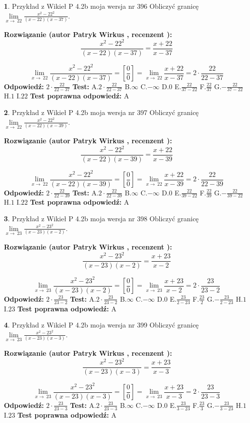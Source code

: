 \documentclass[12pt, a4paper]{article}
\theoremstyle{definition} %
\newtheorem{zad}{}
\newcommand{\zadStart}[1]{\begin{zad}#1\newline}
\newcommand{\zadStop}{\end{zad}}
\newcommand{\rozwStart}[2]{\noindent \textbf{Rozwiązanie (autor #1 , recenzent #2): }\newline}
\newcommand{\rozwStop}{\newline}
\newcommand{\odpStart}{\noindent \textbf{Odpowiedź:}\newline}
\newcommand{\odpStop}{\newline}
\newcommand{\testStart}{\noindent \textbf{Test:}\newline}
\newcommand{\testStop}{\newline}
\newcommand{\kluczStart}{\noindent \textbf{Test poprawna odpowiedź:}\newline}
\newcommand{\kluczStop}{\newline}
\begin{document}
\zadStart{Przykład z Wikieł P 4.2b moja wersja nr 396}
Obliczyć granicę $\lim\limits_{x\to\ 22}\frac{x^{2}-22^{2}}{(x-22)(x-37)}$.
\zadStop
\rozwStart{Patryk Wirkus}{}
$$\frac{x^{2}-22^{2}}{(x-22)(x-37)}=\frac{x+22}{x-37}$$

$$\lim\limits_{x\to\ 22}\frac{x^{2}-22^{2}}{(x-22)(x-37)}=[\frac{0}{0}]=\lim\limits_{x\to\ 22}\frac{x+22}{x-37}=2 \cdot \frac{22}{22-37}$$
\rozwStop
\odpStart
$2 \cdot \frac{22}{22-37}$
\odpStop
\testStart
A.$2 \cdot \frac{22}{22-37}$
B.$\infty$
C.$-\infty$
D.$0$
E.$\frac{22}{37-22}$
F.$\frac{22}{37}$
G.$-\frac{22}{37-22}$
H.$1$
I.$22$
\testStop
\kluczStart
A
\kluczStop



\zadStart{Przykład z Wikieł P 4.2b moja wersja nr 397}
Obliczyć granicę $\lim\limits_{x\to\ 22}\frac{x^{2}-22^{2}}{(x-22)(x-39)}$.
\zadStop
\rozwStart{Patryk Wirkus}{}
$$\frac{x^{2}-22^{2}}{(x-22)(x-39)}=\frac{x+22}{x-39}$$

$$\lim\limits_{x\to\ 22}\frac{x^{2}-22^{2}}{(x-22)(x-39)}=[\frac{0}{0}]=\lim\limits_{x\to\ 22}\frac{x+22}{x-39}=2 \cdot \frac{22}{22-39}$$
\rozwStop
\odpStart
$2 \cdot \frac{22}{22-39}$
\odpStop
\testStart
A.$2 \cdot \frac{22}{22-39}$
B.$\infty$
C.$-\infty$
D.$0$
E.$\frac{22}{39-22}$
F.$\frac{22}{39}$
G.$-\frac{22}{39-22}$
H.$1$
I.$22$
\testStop
\kluczStart
A
\kluczStop



\zadStart{Przykład z Wikieł P 4.2b moja wersja nr 398}
Obliczyć granicę $\lim\limits_{x\to\ 23}\frac{x^{2}-23^{2}}{(x-23)(x-2)}$.
\zadStop
\rozwStart{Patryk Wirkus}{}
$$\frac{x^{2}-23^{2}}{(x-23)(x-2)}=\frac{x+23}{x-2}$$

$$\lim\limits_{x\to\ 23}\frac{x^{2}-23^{2}}{(x-23)(x-2)}=[\frac{0}{0}]=\lim\limits_{x\to\ 23}\frac{x+23}{x-2}=2 \cdot \frac{23}{23-2}$$
\rozwStop
\odpStart
$2 \cdot \frac{23}{23-2}$
\odpStop
\testStart
A.$2 \cdot \frac{23}{23-2}$
B.$\infty$
C.$-\infty$
D.$0$
E.$\frac{23}{2-23}$
F.$\frac{23}{2}$
G.$-\frac{23}{2-23}$
H.$1$
I.$23$
\testStop
\kluczStart
A
\kluczStop



\zadStart{Przykład z Wikieł P 4.2b moja wersja nr 399}
Obliczyć granicę $\lim\limits_{x\to\ 23}\frac{x^{2}-23^{2}}{(x-23)(x-3)}$.
\zadStop
\rozwStart{Patryk Wirkus}{}
$$\frac{x^{2}-23^{2}}{(x-23)(x-3)}=\frac{x+23}{x-3}$$

$$\lim\limits_{x\to\ 23}\frac{x^{2}-23^{2}}{(x-23)(x-3)}=[\frac{0}{0}]=\lim\limits_{x\to\ 23}\frac{x+23}{x-3}=2 \cdot \frac{23}{23-3}$$
\rozwStop
\odpStart
$2 \cdot \frac{23}{23-3}$
\odpStop
\testStart
A.$2 \cdot \frac{23}{23-3}$
B.$\infty$
C.$-\infty$
D.$0$
E.$\frac{23}{3-23}$
F.$\frac{23}{3}$
G.$-\frac{23}{3-23}$
H.$1$
I.$23$
\testStop
\kluczStart
A
\kluczStop
\end{document}
